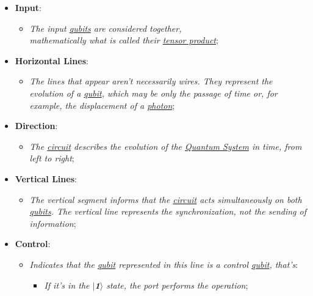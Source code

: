 \documentclass[conference]{IEEEtran}
\begin{document}
\vspace{4pt}

\begin{itemize}
    \item \textbf{Input}:
    \begin{itemize}
        \item \textit{The input \href{https://en.wikipedia.org/wiki/Qubit}{qubits} are considered together, \\mathematically what is called their \href{https://en.wikipedia.org/wiki/Tensor_product}{tensor product}};
    \end{itemize}
    \item \textbf{Horizontal Lines}:
    \begin{itemize}
        \item \textit{The lines that appear aren't necessarily wires. They represent the evolution of a \href{https://en.wikipedia.org/wiki/Qubit}{qubit}, which may be only the passage of time or, for example, the displacement of a \href{https://en.wikipedia.org/wiki/Photon}{photon}};
    \end{itemize}
    \item \textbf{Direction}:
    \begin{itemize}
        \item \textit{The \href{https://en.wikipedia.org/wiki/Circuit}{circuit} describes the evolution of the \href{https://en.wikipedia.org/wiki/Quantum_system}{Quantum System} in time, from left to right};
    \end{itemize}
    \item \textbf{Vertical Lines}:
    \begin{itemize}
        \item \textit{The vertical segment informs that the \href{https://en.wikipedia.org/wiki/Circuit}{circuit} acts simultaneously on both \href{https://en.wikipedia.org/wiki/Qubit}{qubits}. The vertical line represents the synchronization, not the sending of information};
    \end{itemize}
    \item \textbf{Control}:
    \begin{itemize}
        \item \textit{Indicates that the \href{https://en.wikipedia.org/wiki/Qubit}{qubit} represented in this line is a control \href{https://en.wikipedia.org/wiki/Qubit}{qubit}, that's}:
        \begin{itemize}
            \item \textit{If it's in the \textbf{$\mid$1$\rangle$} state, the port performs the operation};

\end{itemize}
\end{itemize}
\end{itemize}
\end{document}
